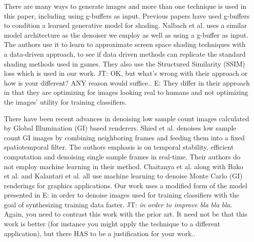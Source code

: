\documentclass[10pt,twocolumn,letterpaper]{article}
\newcommand{\tompson}[1]{{\color{green} JT: #1}}
\newcommand{\edit}[1]{{\color{red} E: #1}}
\begin{document}
There are many ways to generate images and more than one technique is used in this paper, including using g-buffers as input. Previous papers have used g-buffers to condition a learned generative model for shading. Nalbach et al. \cite{DBLP:journals/corr/NalbachAMSR16} uses a similar model architecture as the denoiser we employ as well as using a g-buffer as input.  The authors use it to learn to approximate screen space shading techniques with a data-driven approach, to see if data driven methods can replicate the standard shading methods used in games.  They also use the Structured Similarity (SSIM) loss which is used in our work. \tompson{OK, but what's wrong with their approach or how is your different? ANY reason would suffice.}.
\edit{They differ in their approach in that they are optimizing for images looking real to humans and not optimizing the images' utility for training classifiers.} 


There have been recent advances in denoising low sample count images calculated by Global Illumination (GI) based renderers.
Shied et al. \cite{Schied:2017:SVF:3105762.3105770} denoises low sample count GI images by combining neighboring frames and feeding them into a fixed spatiotemporal filter.  The authors emphasis is on temporal stability, efficient computation and denoising single sample frames in real-time. Their authors do not employ machine learning in their method. 
Chaitanya et al. \cite{Chaitanya:2017:IRM:3072959.3073601} along with 
Bako et al. \cite{Bako17} and 
Kalantari et al. \cite{Kalantari:2015:MLA:2809654.2766977} all use machine learning to denoise Monte Carlo (GI) renderings for graphics applications.  Our work uses a modified form of the model presented in \cite{Chaitanya:2017:IRM:3072959.3073601} \edit{in order to denoise images used for training classifiers with the goal of synthesizing training data faster.} \tompson{\textit{in order to improve bla bla bla}. Again, you need to contrast this work with the prior art. It need not be that this work is better (for instance you might apply the technique to a different application), but there HAS to be a justification for your work.}.
\end{document}
